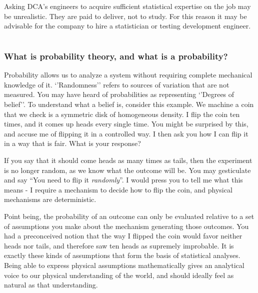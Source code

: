 \documentclass[11pt,a4paper,article]{memoir} %
\begin{document}
Asking DCA's engineers to acquire sufficient statistical expertise on the job may be unrealistic. They are paid to deliver, not to study. For this reason it may be advisable for the company to hire a statistician or testing development engineer.

\newpage



\newpage
\appendix
\chapter{}
\subsection{What is probability theory, and what is a probability?}
Probability allows us to analyze a system without requiring complete mechanical knowledge of it. `'Randomness'' refers to sources of variation that are not measured. You may have heard of probabilities as representing `'Degrees of belief''. To understand what a belief is, consider this example. We machine a coin that we check is a symmetric disk of homogeneous density. I flip the coin ten times, and it comes up heads every single time. You might be surprised by this, and accuse me of flipping it in a controlled way. I then ask you how I can flip it in a way that is fair. What is your response?
\par
If you say that it should come heads as many times as tails, then the experiment is no longer random, as we know what the outcome will be. You may gesticulate and say ``You need to flip it \emph{randomly}''. I would press you to tell me what this means - I require a mechanism to decide how to flip the coin, and physical mechanisms are deterministic.
\par
Point being, the probability of an outcome can only be evaluated relative to a set of assumptions you make about the mechanism generating those outcomes. You had a preconceived notion that the way I flipped the coin would favor neither heads nor tails, and therefore saw ten heads as supremely improbable. It is exactly these kinds of assumptions that form the basis of statistical analyses. Being able to express physical assumptions mathematically gives an analytical voice to our physical understanding of the world, and should ideally feel as natural as that understanding.
\newpage
\end{document}
